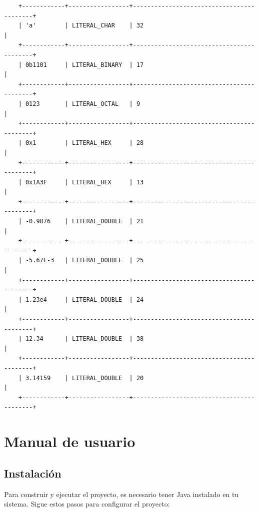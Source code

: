 \documentclass[a4paper,12pt]{article}
\begin{document}
\begin{flushleft}
\begin{verbatim}
	+------------+-----------------+------------------------------------------+
	| 'a'        | LITERAL_CHAR    | 32                                       |
	+------------+-----------------+------------------------------------------+
	| 0b1101     | LITERAL_BINARY  | 17                                       |
	+------------+-----------------+------------------------------------------+
	| 0123       | LITERAL_OCTAL   | 9                                        |
	+------------+-----------------+------------------------------------------+
	| 0x1        | LITERAL_HEX     | 28                                       |
	+------------+-----------------+------------------------------------------+
	| 0x1A3F     | LITERAL_HEX     | 13                                       |
	+------------+-----------------+------------------------------------------+
	| -0.9876    | LITERAL_DOUBLE  | 21                                       |
	+------------+-----------------+------------------------------------------+
	| -5.67E-3   | LITERAL_DOUBLE  | 25                                       |
	+------------+-----------------+------------------------------------------+
	| 1.23e4     | LITERAL_DOUBLE  | 24                                       |
	+------------+-----------------+------------------------------------------+
	| 12.34      | LITERAL_DOUBLE  | 38                                       |
	+------------+-----------------+------------------------------------------+
	| 3.14159    | LITERAL_DOUBLE  | 20                                       |
	+------------+-----------------+------------------------------------------+
	\end{verbatim}
\end{flushleft}


\section*{Manual de usuario}
\subsection*{Instalación}
Para construir y ejecutar el proyecto, es necesario tener Java instalado en tu sistema. Sigue estos pasos para configurar el proyecto:
\end{document}
